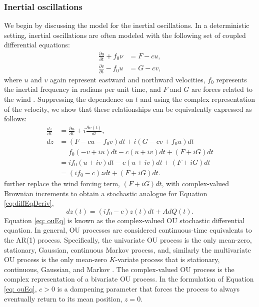 \documentclass{stat572Style}
\begin{document}
\subsubsection{Inertial oscillations}
We begin by discussing the model for the inertial oscillations. 
In a deterministic setting, inertial oscillations are often modeled with the following set of coupled differential equations:
\begin{align}
\label{eq: deterOsc}
\frac{\partial u }{\partial t}  + f_{0} \nu &= F - cu,\\ \nonumber
\frac{\partial v}{\partial t} - f_{0}u &= G - cv,
\end{align}
where $u$ and $v$ again represent eastward and northward velocities, $f_{0}$ represents the inertial frequency in radians per unit time, and $F$ and $G$ are forces related to the wind  \citep{Pollard1970}. 
Suppressing the dependence on $t$ and using the complex representation of the velocity,  we show that these relationships can be equivalently expressed as follows:
\begin{align}
\label{eq:diffEqDeriv}
\nonumber
\frac{dz}{dt} &= \frac{\partial u}{dt} + i\frac{\partial v(t)}{dt}, \\ \nonumber
dz &= (F - c u- f_{0}v)dt + i(G - cv + f_{0}u)dt\\ \nonumber
&= f_{0}(-v + iu)dt - c(u + iv)dt + (F + iG)dt\\ \nonumber
&= if_{0}(u + iv)dt - c(u + iv)dt + (F + iG)dt\\ 
&= (if_{0} - c)z dt + (F + iG)dt. 
\end{align}
\citet{Sykulski2016} further replace the wind forcing term, $(F + iG)dt$,  with complex-valued Brownian increments \citep{Mandelbrot1968} to obtain a stochastic analogue for Equation \eqref{eq:diffEqDeriv},
 \begin{equation}
\label{eq: ouEq}
dz(t) = (i f_{0} -c) z(t) dt + A d Q(t). 
\end{equation}  
Equation \eqref{eq: ouEq}  is known as the complex-valued OU stochastic differential equation. 
In general,  OU processes are considered continuous-time equivalents to the AR(1) process. Specifically,  the univariate OU process is the only mean-zero, stationary, Gaussian, continuous Markov process, and, similarly the multivariate OU process is the only mean-zero $K$-variate process that is stationary, continuous, Gaussian, and Markov \citep{Schach1971}.
 The complex-valued OU process is the complex representation of a bivariate OU process.  
 In the formulation of Equation \eqref{eq: ouEq}, $c > 0$ is a dampening parameter that forces the process to always eventually return to its mean position, $z = 0$.  
\end{document}

